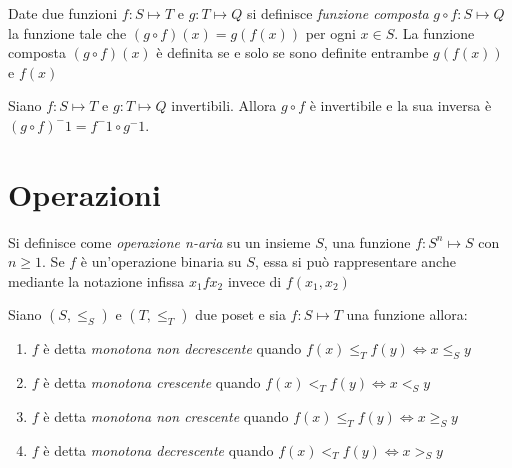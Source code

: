 Date due funzioni $f:S \mapsto T$ e $g:T \mapsto Q$ si definisce \emph{funzione composta}
$g \circ f:S \mapsto Q$ la funzione tale che $(g \circ f)(x) = g(f(x))$ per ogni $x \in S$.
La funzione composta $(g \circ f)(x)$ è definita se e solo se sono definite entrambe
$g(f(x))$ e $f(x)$


\begin{thm}
Siano $f:S \mapsto T$ e $g:T \mapsto Q$ invertibili. Allora $g \circ f$ è invertibile
e la sua inversa è $(g \circ f) ^ -1 = f^-1 \circ g ^ -1$.
\end{thm}

\section{Operazioni}
Si definisce come \emph{operazione n-aria} su un insieme $S$, una funzione
$f:S^n \mapsto S$ con $n \geq 1$.
Se $f$ è un'operazione binaria su $S$, essa si può rappresentare anche mediante
la notazione infissa $x_1 f x_2$ invece di $f(x_1,x_2)$


\begin{defi}
    Siano $(S,\leq _S)$ e $(T,\leq _T)$ due poset e sia $f:S \mapsto T$ una funzione allora:
\end{defi}
\begin{enumerate}
    \item $f$ è detta \emph{monotona non decrescente} quando $f(x) \leq_T f(y) \iff x \leq_S y$
    \item $f$ è detta \emph{monotona crescente} quando $f(x) <_T f(y) \iff x <_S y$
    \item $f$ è detta \emph{monotona non crescente} quando $f(x) \leq_T f(y) \iff x \geq_S y$
    \item $f$ è detta \emph{monotona decrescente} quando $f(x) <_T f(y) \iff x >_S y$
\end{enumerate}
